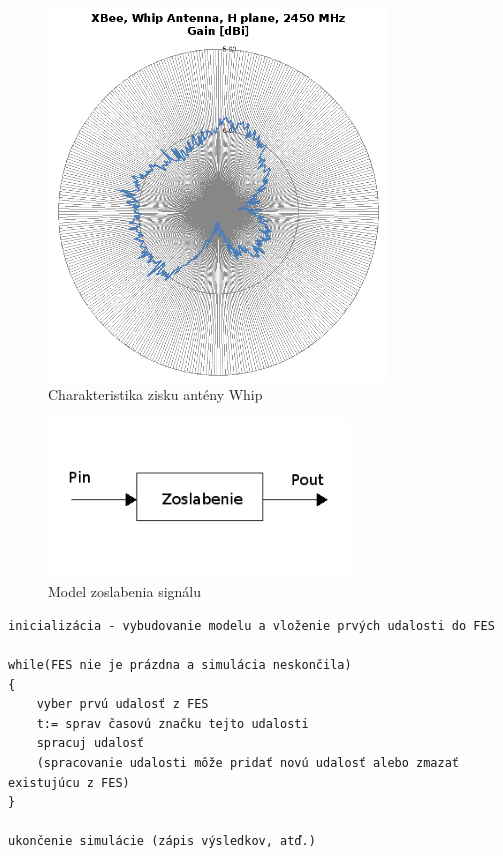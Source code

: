 \documentclass[11pt,twoside,a4paper]{book}
\begin{document}


\begin{figure}[htbp]
 \centering
 \includegraphics[width=9cm]{./figures/xbeeWhipGain.png}
 \caption{Charakteristika zisku antény Whip}
 \label{fig:xbeeWhipGain}
\end{figure}


\begin{figure}[htbp]
 \centering
 \includegraphics[width=8cm]{./figures/zoslabenie.png}
 \caption{Model zoslabenia signálu}
 \label{fig:zoslab}
\end{figure}





\begin{verbatim}
inicializácia - vybudovanie modelu a vloženie prvých udalosti do FES

while(FES nie je prázdna a simulácia neskončila) 
{
	vyber prvú udalosť z FES
	t:= sprav časovú značku tejto udalosti
	spracuj udalosť
	(spracovanie udalosti môže pridať novú udalosť alebo zmazať existujúcu z FES)
}

ukončenie simulácie (zápis výsledkov, atď.)
\end{verbatim}
\end{document}

